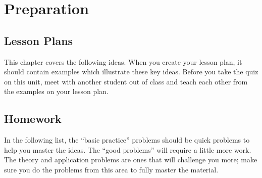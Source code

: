 \section{Preparation}

\subsection{Lesson Plans}

This chapter covers the following ideas. When you create your lesson plan, it should contain examples which illustrate these key ideas. Before you take the quiz on this unit, meet with another student out of class and teach each other from the examples on your lesson plan. 





\subsection{Homework}

In the following list, the ``basic practice'' problems should be quick
problems to help you master the ideas.  The ``good problems'' will
require a little more work.  The theory and application problems are
ones that will challenge you more; make sure you do the problems from
this area to fully master the material.  



